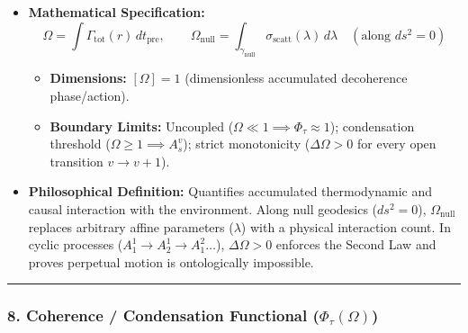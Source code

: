 \documentclass[
]{article}
\providecommand{\tightlist}{%
  \setlength{\itemsep}{0pt}\setlength{\parskip}{0pt}}
\begin{document}
\begin{itemize}
\tightlist
\item
  \textbf{Mathematical Specification:}
  \[\Omega = \int \Gamma_{\mathrm{tot}}(r) \, dt_{\mathrm{pre}}, \qquad \Omega_{\mathrm{null}} = \int_{\gamma_{\mathrm{null}}} \sigma_{\mathrm{scatt}}(\lambda) \, d\lambda \quad (\text{along } ds^2 = 0)\]

  \begin{itemize}
  \tightlist
  \item
    \textbf{Dimensions:} \([\Omega] = 1\) (dimensionless accumulated
    decoherence phase/action).
  \item
    \textbf{Boundary Limits:} Uncoupled
    (\(\Omega \ll 1 \implies \Phi_\tau \approx 1\)); condensation
    threshold (\(\Omega \ge 1 \implies A_s^v\)); strict monotonicity
    (\(\Delta\Omega > 0\) for every open transition \(v \to v+1\)).
  \end{itemize}
\item
  \textbf{Philosophical Definition:} Quantifies accumulated
  thermodynamic and causal interaction with the environment. Along null
  geodesics (\(ds^2 = 0\)), \(\Omega_{\mathrm{null}}\) replaces
  arbitrary affine parameters (\(\lambda\)) with a physical interaction
  count. In cyclic processes (\(A_1^1 \to A_2^1 \to A_1^2 \dots\)),
  \(\Delta\Omega > 0\) enforces the Second Law and proves perpetual
  motion is ontologically impossible.
\end{itemize}

\begin{center}\rule{0.5\linewidth}{0.5pt}\end{center}

\subsubsection{\texorpdfstring{8. Coherence / Condensation Functional
(\(\Phi_\tau(\Omega)\))}{8. Coherence / Condensation Functional (\textbackslash Phi\_\textbackslash tau(\textbackslash Omega))}}\label{coherence-condensation-functional-phi_tauomega}
\end{document}
